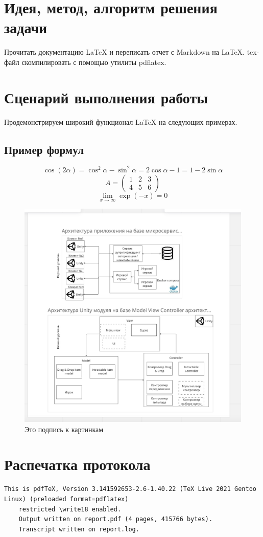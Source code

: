 \documentclass[12pt, letterpaper]{article}
\begin{document}
\section{Идея, метод, алгоритм решения задачи}
Прочитать документацию \LaTeX{} и переписать отчет с Markdown на \LaTeX{}. tex-файл скомпилировать с помощью утилиты pdflatex.
\section{Сценарий выполнения работы}
Продемонстрируем широкий функционал \LaTeX{} на следующих примерах.
\subsection{Пример формул}
\[\cos (2\alpha) = \cos^2 \alpha - \sin^2 \alpha = 2\cos\alpha - 1 = 1 - 2\sin\alpha\]
\[A=
\begin{pmatrix}
1 & 2 & 3\\
4 & 5 & 6
\end{pmatrix}\]
\[
\lim\limits_{x \to \infty} \exp(-x) = 0
\]
\begin{figure}[h]
\centering
\includegraphics[width=0.9\linewidth]{p.jpg}
\caption{Это подпись к картинкам}
\label{fig:mpr}
\end{figure}
\section{Распечатка протокола}
\begin{lstlisting}[breaklines]
    This is pdfTeX, Version 3.141592653-2.6-1.40.22 (TeX Live 2021 Gentoo Linux) (preloaded format=pdflatex)
    restricted \write18 enabled.
    Output written on report.pdf (4 pages, 415766 bytes).
    Transcript written on report.log.
\end{lstlisting}  
\end{document}
